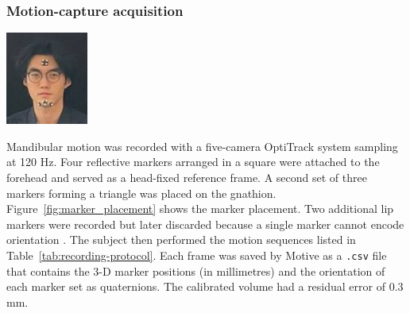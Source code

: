 \subsubsection{Motion-capture acquisition}
\begin{minipage}{0.15\textwidth}
  \centering
  \includegraphics[width=\textwidth]{figures/benhui_marker.jpg}
  \label{fig:marker_placement}
\end{minipage}
\hfill
\begin{minipage}{0.80\textwidth}
Mandibular motion was recorded with a five-camera OptiTrack system sampling at 120 Hz.
Four reflective markers arranged in a square were attached to the forehead and served as a head-fixed reference frame.
A second set of three markers forming a triangle was placed on the gnathion. Figure~\ref{fig:marker_placement} shows the marker placement. 
Two additional lip markers were recorded but later discarded because a single marker cannot encode orientation \cite{motion_capture_adult,motion_capture_children}.
The subject then performed the motion sequences listed in Table~\ref{tab:recording-protocol}. Each frame was saved by Motive as a \texttt{.csv} file that contains
the 3-D marker positions (in millimetres) and the orientation of each marker set as quaternions. The calibrated volume had a residual error of $0.3\,$mm.
\end{minipage}

